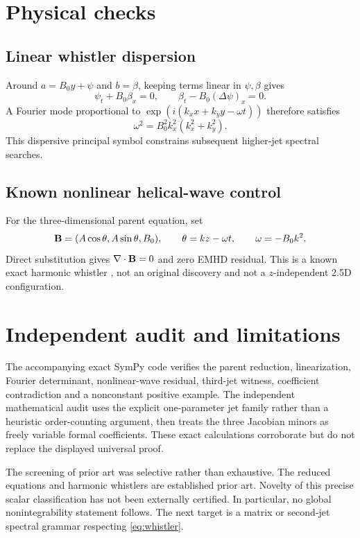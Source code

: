\documentclass[11pt,a4paper]{article}
\begin{document}
\section{Physical checks}
\subsection{Linear whistler dispersion}
Around \(a=B_0y+\psi\) and \(b=\beta\), keeping terms
linear in \(\psi,\beta\) gives
\[
 \psi_t+B_0\beta_x=0,\qquad
 \beta_t-B_0(\Delta\psi)_x=0.
\]
A Fourier mode proportional to
\(\exp(i(k_xx+k_yy-\omega t))\) therefore satisfies
\begin{equation}\label{eq:whistler}
 \omega^2=B_0^2k_x^2(k_x^2+k_y^2).
\end{equation}
This dispersive principal symbol constrains subsequent
higher-jet spectral searches.

\subsection{Known nonlinear helical-wave control}
For the three-dimensional parent equation, set
\[
 {\bf B}=(A\cos\theta,A\sin\theta,B_0),\qquad
 \theta=kz-\omega t,\qquad \omega=-B_0k^2.
\]
Direct substitution gives \(\nabla\cdot{\bf B}=0\)
and zero EMHD residual. This is a known exact harmonic
whistler \cite{lyutikov2013}, not an original discovery
and not a \(z\)-independent 2.5D configuration.

\section{Independent audit and limitations}
The accompanying exact SymPy code verifies the parent reduction,
linearization, Fourier determinant, nonlinear-wave residual,
third-jet witness, coefficient contradiction and a nonconstant
positive example. The independent mathematical audit uses the
explicit one-parameter jet family rather than a heuristic
order-counting argument, then treats the three Jacobian
minors as freely variable formal coefficients.
These exact calculations corroborate but do not replace the
displayed universal proof.

The screening of prior art was selective rather than
exhaustive. The reduced equations and harmonic whistlers are
established prior art. Novelty of this precise scalar
classification has not been externally certified. In
particular, no global nonintegrability statement follows.
The next target is a matrix or second-jet spectral grammar
respecting \eqref{eq:whistler}.
\end{document}
